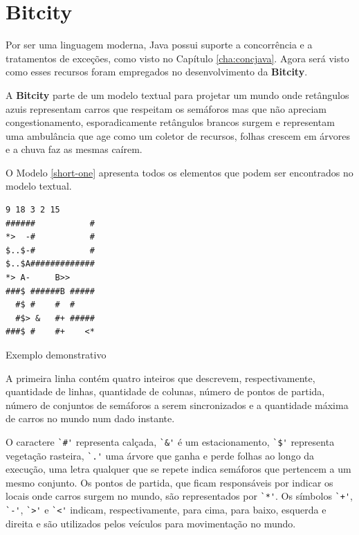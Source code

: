 \chapter{Bitcity}
\label{cha:bitcity}

Por ser uma linguagem moderna, Java possui suporte a concorrência e a
tratamentos de exceções, como visto no Capítulo \ref{cha:concjava}. Agora 
será visto como esses recursos foram empregados no desenvolvimento da
\textbf{Bitcity}.

A \textbf{Bitcity} parte de um modelo textual para projetar um mundo
onde retângulos azuis representam carros que respeitam os semáforos
mas que não apreciam congestionamento, esporadicamente
retângulos brancos surgem e representam uma ambulância que age como um
coletor de recursos, folhas crescem em árvores e a chuva faz as mesmas
caírem.

O Modelo \ref{short-one} apresenta todos os elementos que podem ser
encontrados no modelo textual.

\begin{model}
\centering
\begin{BVerbatim}
9 18 3 2 15
######           #
*>  -#           #
$..$-#           # 
$..$A#############
*> A-     B>>
###$ ######B #####
  #$ #    #  #    
  #$> &   #+ #####
###$ #    #+    <*
\end{BVerbatim}
  \caption{Exemplo demonstrativo \label{short-one}}
\end{model}

A primeira linha contém quatro inteiros que descrevem, respectivamente,
quantidade de linhas, quantidade de colunas, número de pontos de
partida, número de conjuntos de semáforos a serem sincronizados e a
quantidade máxima de carros no mundo num dado instante.

O caractere \verb!`#'! representa calçada, \verb!`&'! é um
estacionamento, \verb!`$'! representa
vegetação rasteira, \verb!`.'! uma árvore que ganha e perde folhas ao
longo da execução, uma letra qualquer que se repete indica semáforos
que pertencem a um mesmo conjunto. Os pontos de partida, que ficam
responsáveis por indicar os locais onde carros surgem no mundo, são
representados por \verb!`*'!. Os símbolos \verb!`+'!, \verb!`-'!,
\verb!`>'! e \verb!`<'! indicam, respectivamente, para cima, para
baixo, esquerda e direita e são utilizados pelos veículos para
movimentação no mundo.

